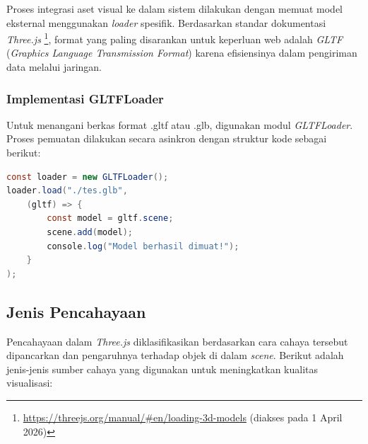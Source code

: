 Proses integrasi aset visual ke dalam sistem dilakukan dengan memuat model eksternal menggunakan \textit{loader} spesifik. Berdasarkan standar dokumentasi \textit{Three.js} \footnote{\url{https://threejs.org/manual/\#en/loading-3d-models} (diakses pada 1 April 2026)}, format yang paling disarankan untuk keperluan web adalah \textit{GLTF} (\textit{Graphics Language Transmission Format}) karena efisiensinya dalam pengiriman data melalui jaringan.

\subsubsection{Implementasi GLTFLoader}
Untuk menangani berkas format .gltf atau .glb, digunakan modul \textit{GLTFLoader}. Proses pemuatan dilakukan secara asinkron dengan struktur kode sebagai berikut:

\begin{lstlisting}[language=Java, caption={Implementasi Pemuatan Model GLTF}]
const loader = new GLTFLoader();
loader.load("./tes.glb", 
    (gltf) => {
        const model = gltf.scene;
        scene.add(model);
        console.log("Model berhasil dimuat!");
    }
);
\end{lstlisting}

\subsection{Jenis Pencahayaan}
\label{subsec:jenis_cahaya}

Pencahayaan dalam \textit{Three.js} diklasifikasikan berdasarkan cara cahaya tersebut dipancarkan dan pengaruhnya terhadap objek di dalam \textit{scene}. Berikut adalah jenis-jenis sumber cahaya yang digunakan untuk meningkatkan kualitas visualisasi:

